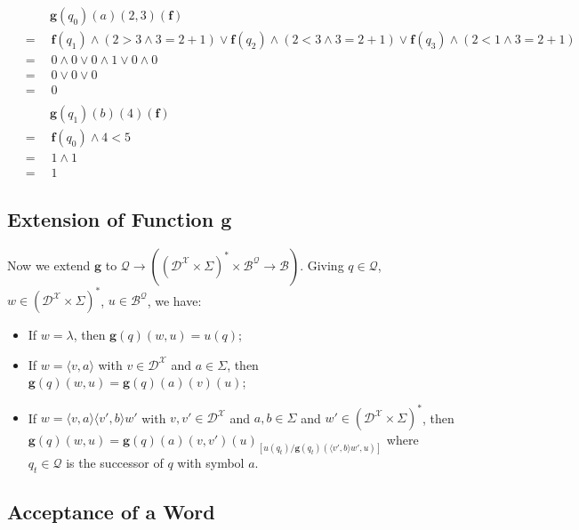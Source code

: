 \documentclass[a4paper, 11pt]{article}
\begin{document}
	\begin{align*}
		&\qquad\ \bm{g}(q_0)(a)(2, 3)(\bm{f})\\
		&= \quad \bm{f}(q_1) \land (2 > 3 \land 3 = 2 + 1) \lor \bm{f}(q_2) \land (2 < 3 \land 3 = 2 + 1) \lor \bm{f}(q_3) \land (2 < 1 \land 3 = 2 + 1)\\
		&= \quad 0 \land 0 \lor 0 \land 1 \lor 0 \land 0\\
		&= \quad 0 \lor 0 \lor 0\\
		&= \quad 0 \\
		\\
		&\qquad\ \bm{g}(q_1)(b)(4)(\bm{f})\\
		&=  \quad \bm{f}(q_0) \land 4 < 5\\
		&=  \quad 1 \land 1\\
		&=  \quad 1
	\end{align*}
	
	\subsection{Extension of Function $\bm{g}$}
	
	Now we extend $\bm{g}$ to $\mathcal{Q} \to ((\mathcal{D}^{\mathcal{X}} \times \Sigma)^* \times \mathcal{B}^{\mathcal{Q}} \to \mathcal{B})$. Giving $q \in \mathcal{Q}$, $w \in (\mathcal{D}^{\mathcal{X}} \times \Sigma)^*$, $u \in \mathcal{B}^{\mathcal{Q}}$, we have:
	\begin{itemize}
		\item If $w = \lambda$, then $\bm{g}(q)(w, u) = u(q)$;
		\item If $w = \langle v, a \rangle$ with $v \in \mathcal{D}^{\mathcal{X}}$ and $a \in \Sigma$, then $\bm{g}(q)(w, u) = \bm{g}(q)(a)(v)(u)$;
		\item If $w = \langle v, a \rangle \langle v', b \rangle w'$ with $v, v' \in \mathcal{D}^{\mathcal{X}}$ and $a, b \in \Sigma$ and $w' \in (\mathcal{D}^{\mathcal{X}} \times \Sigma)^*$, then $\bm{g}(q)(w, u) = \bm{g}(q)(a)(v, v')(u)_{[u(q_t) / \bm{g}(q_t)(\langle v', b \rangle w', u)]}$ where $q_t \in \mathcal{Q}$ is the successor of $q$ with symbol $a$.
	\end{itemize}
	
	\subsection{Acceptance of a Word}
	
\end{document}
